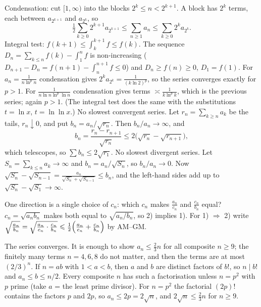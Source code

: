 \documentclass[11pt,a4paper]{article}
\begin{document}

 Condensation: cut \([1,\infty)\) into the blocks \(2^k\le n\lt2^{k+1}\). A block has \(2^k\) terms, each between \(a_{2^{k+1}}\) and \(a_{2^k}\), so
\[\tfrac12\sum_{k\ge0}2^{k+1}a_{2^{k+1}}\le\sum_{n\ge1}a_n\le\sum_{k\ge0}2^ka_{2^k}.\]
Integral test: \(f(k+1)\le\int_k^{k+1}f\le f(k)\). The sequence \(D_n=\sum_{k\le n}f(k)-\int_1^nf\) is non-increasing (\(D_{n+1}-D_n=f(n+1)-\int_n^{n+1}f\le0\)) and \(D_n\ge f(n)\ge0\), \(D_1=f(1)\).
 For \(a_n=\frac1{n\ln^pn}\) condensation gives \(2^ka_{2^k}=\frac1{(k\ln2)^p}\), so the series converges exactly for \(p\gt1\). For \(\frac1{n\ln n\ln^p\ln n}\) condensation gives terms \(\asymp\frac1{k\ln^pk}\), which is the previous series; again \(p\gt1\). (The integral test does the same with the substitutions \(t=\ln x\), \(t=\ln\ln x\).)
 No slowest convergent series. Let \(r_n=\sum_{k\ge n}a_k\) be the tails, \(r_n\downarrow0\), and put \(b_n=a_n/\sqrt{r_n}\). Then \(b_n/a_n\to\infty\), and
\[b_n=\frac{r_n-r_{n+1}}{\sqrt{r_n}}\le2\bigl(\sqrt{r_n}-\sqrt{r_{n+1}}\bigr),\]
which telescopes, so \(\sum b_n\le2\sqrt{r_1}\).
 No slowest divergent series. Let \(S_n=\sum_{k\le n}a_k\to\infty\) and \(b_n=a_n/\sqrt{S_n}\), so \(b_n/a_n\to0\). Now \(\sqrt{S_n}-\sqrt{S_{n-1}}=\frac{a_n}{\sqrt{S_n}+\sqrt{S_{n-1}}}\le b_n\), and the left-hand sides add up to \(\sqrt{S_n}-\sqrt{S_1}\to\infty\).

 One direction is a single choice of \(c_n\): which \(c_n\) makes \(\frac{a_n}{c_n}\) and \(\frac{c_n}{b_n}\) equal?
 \(c_n=\sqrt{a_nb_n}\) makes both equal to \(\sqrt{a_n/b_n}\), so 2) implies 1).
 For 1) \(\Rightarrow\) 2) write \(\sqrt{\frac{a_n}{b_n}}=\sqrt{\frac{a_n}{c_n}\cdot\frac{c_n}{b_n}}\le\frac12\Bigl(\frac{a_n}{c_n}+\frac{c_n}{b_n}\Bigr)\) by AM--GM.

 The series converges. It is enough to show \(a_n\le\frac23n\) for all composite \(n\ge9\); the finitely many terms \(n=4,6,8\) do not matter, and then the terms are at most \((2/3)^n\).
 If \(n=ab\) with \(1\lt a\lt b\), then \(a\) and \(b\) are distinct factors of \(b!\), so \(n\mid b!\) and \(a_n\le b\le n/2\). Every composite \(n\) has such a factorisation unless \(n=p^2\) with \(p\) prime (take \(a\) = the least prime divisor).
 For \(n=p^2\) the factorial \((2p)!\) contains the factors \(p\) and \(2p\), so \(a_n\le2p=2\sqrt n\), and \(2\sqrt n\le\frac23n\) for \(n\ge9\).
\end{document}
